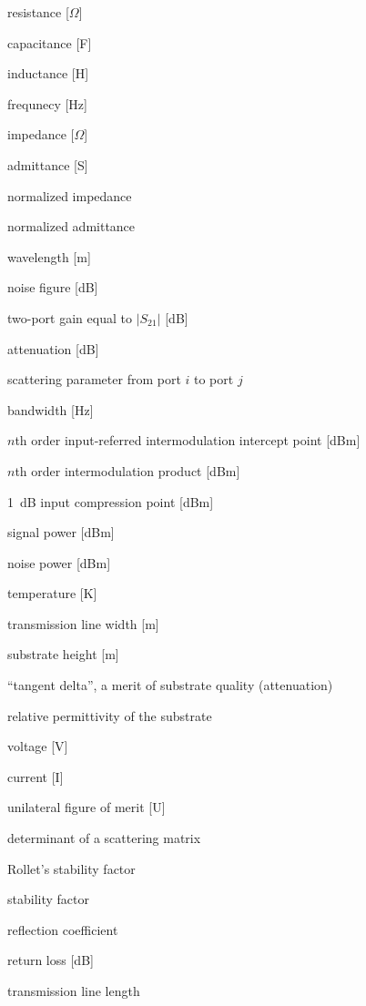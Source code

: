 \documentclass[a4paper, 12pt]{article}
\begin{document}
	\begin{description}[font=\rmfamily\mdseries, leftmargin=25.5mm, style=sameline, align=right, labelsep=5mm, itemsep=-2pt]
		\item[$R$]						resistance [$\Omega$]
		\item[$C$]						capacitance [F]
		\item[$L$]						inductance [H]
		\item[$f$] 						frequnecy [Hz]
		\item[$Z$] 						impedance [$\Omega$]
		\item[$Y$] 						admittance [S]
		\item[$z$] 						normalized impedance
		\item[$y$] 						normalized admittance
		\item[$\lambda$] 				wavelength [m]
		\item[$F$] 						noise figure [dB]
		\item[$G$] 						two-port gain equal to $|S_{21}|$ [dB]
		\item[$L$] 						attenuation [dB]
		\item[$S_{ij}$] 				scattering parameter from port $i$ to port $j$
		\item[$\mathit{BW}$] 			bandwidth [Hz]
		\item[$\mathit{IIP}_n$] 		$n$th order input-referred intermodulation intercept point [dBm]
		\item[$\mathit{IM}_n$] 			$n$th order intermodulation product [dBm]
		\item[$\mathit{ICP}$] 			1~dB input compression point [dBm]
		\item[$P$] 						signal power [dBm]
		\item[$N$] 						noise power [dBm]
		\item[$T$] 						temperature [K]
		\item[$w$] 						transmission line width [m]
		\item[$h$] 						substrate height [m]
		\item[$\tan \delta$]			``tangent delta'', a merit of substrate quality (attenuation)
		\item[$\epsilon_\mathrm{r}$]	relative permittivity of the substrate
		\item[$V$]						voltage [V]
		\item[$I$]						current [I]
		\item[$U$]						unilateral figure of merit [U]
		\item[$\Delta$]					determinant of a scattering matrix
		\item[$K$]						Rollet's stability factor
		\item[$\mu$]					stability factor
		\item[$\rho$]					reflection coefficient
		\item[$\textit{RL}$] 			return loss [dB]
		\item[$l$]						transmission line length
	\end{description}
\end{document}
